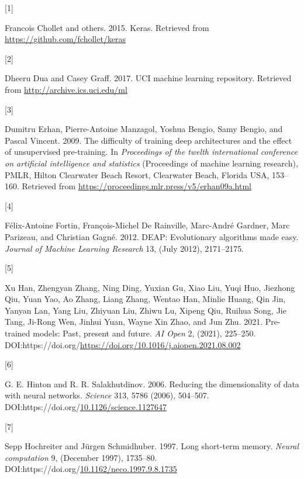 \documentclass[
  11pt,
]{article}
\newlength{\cslhangindent}
\newlength{\csllabelwidth}
\newlength{\cslentryspacingunit} %
\newenvironment{CSLReferences}[2] %
 {%
  \setlength{\parindent}{0pt}
  \ifodd #1
  \let\oldpar\par
  \def\par{\hangindent=\cslhangindent\oldpar}
  \fi
  \setlength{\parskip}{#2\cslentryspacingunit}
 }%
 {}
\newcommand{\CSLLeftMargin}[1]{\parbox[t]{\csllabelwidth}{#1}}
\newcommand{\CSLRightInline}[1]{\parbox[t]{\linewidth - \csllabelwidth}{#1}\break}
\begin{document}
\hypertarget{refs}{}
\begin{CSLReferences}{0}{0}
\leavevmode{}%
\CSLLeftMargin{{[}1{]} }%
\CSLRightInline{Francois Chollet and others. 2015. Keras. Retrieved from
\url{https://github.com/fchollet/keras}}

\leavevmode{}%
\CSLLeftMargin{{[}2{]} }%
\CSLRightInline{Dheeru Dua and Casey Graff. 2017. {UCI} machine learning
repository. Retrieved from \url{http://archive.ics.uci.edu/ml}}

\leavevmode{}%
\CSLLeftMargin{{[}3{]} }%
\CSLRightInline{Dumitru Erhan, Pierre-Antoine Manzagol, Yoshua Bengio,
Samy Bengio, and Pascal Vincent. 2009. The difficulty of training deep
architectures and the effect of unsupervised pre-training. In
\emph{Proceedings of the twelth international conference on artificial
intelligence and statistics} (Proceedings of machine learning research),
PMLR, Hilton Clearwater Beach Resort, Clearwater Beach, Florida USA,
153--160. Retrieved from
\url{https://proceedings.mlr.press/v5/erhan09a.html}}

\leavevmode{}%
\CSLLeftMargin{{[}4{]} }%
\CSLRightInline{Félix-Antoine Fortin, François-Michel De Rainville,
Marc-André Gardner, Marc Parizeau, and Christian Gagné. 2012. {DEAP}:
Evolutionary algorithms made easy. \emph{Journal of Machine Learning
Research} 13, (July 2012), 2171--2175.}

\leavevmode{}%
\CSLLeftMargin{{[}5{]} }%
\CSLRightInline{Xu Han, Zhengyan Zhang, Ning Ding, Yuxian Gu, Xiao Liu,
Yuqi Huo, Jiezhong Qiu, Yuan Yao, Ao Zhang, Liang Zhang, Wentao Han,
Minlie Huang, Qin Jin, Yanyan Lan, Yang Liu, Zhiyuan Liu, Zhiwu Lu,
Xipeng Qiu, Ruihua Song, Jie Tang, Ji-Rong Wen, Jinhui Yuan, Wayne Xin
Zhao, and Jun Zhu. 2021. Pre-trained models: Past, present and future.
\emph{AI Open} 2, (2021), 225--250.
DOI:https://doi.org/\url{https://doi.org/10.1016/j.aiopen.2021.08.002}}

\leavevmode{}%
\CSLLeftMargin{{[}6{]} }%
\CSLRightInline{G. E. Hinton and R. R. Salakhutdinov. 2006. Reducing the
dimensionality of data with neural networks. \emph{Science} 313, 5786
(2006), 504--507.
DOI:https://doi.org/\href{https://doi.org/10.1126/science.1127647}{10.1126/science.1127647}}

\leavevmode{}%
\CSLLeftMargin{{[}7{]} }%
\CSLRightInline{Sepp Hochreiter and Jürgen Schmidhuber. 1997. Long
short-term memory. \emph{Neural computation} 9, (December 1997),
1735--80.
DOI:https://doi.org/\href{https://doi.org/10.1162/neco.1997.9.8.1735}{10.1162/neco.1997.9.8.1735}}


\end{CSLReferences}
\end{document}
